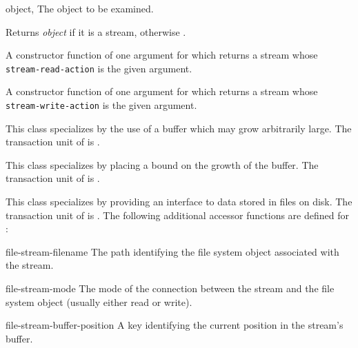 \begin{optDefinition}
\begin{arguments}
  \item[object, \classref{object}] The object to be examined.
\end{arguments}
%
\result%
Returns {\em object\/} if it is a stream, otherwise \nil{}.

A constructor function of one argument for  which
returns a stream whose {\tt stream-read-action} is the given argument.

A constructor function of one argument for  which returns a
stream whose {\tt stream-write-action} is the given argument.

%
This class specializes  by the use of a buffer which may grow
arbitrarily large. The transaction unit of  is
.

%
This class specializes  by placing a bound on the
growth of the buffer. The transaction unit of 
is .

%
This class specializes  by providing an
interface to data stored in files on disk. The transaction unit of
 is . The following additional
accessor functions are defined for :
%
\begin{functions}
    \item[file-stream-filename] The path identifying the file system object
    associated with the stream.
    \item[file-stream-mode] The mode of the connection between the stream and
    the file system object (usually either read or write).
    \item[file-stream-buffer-position] A key identifying the current position in
    the stream's buffer.
\end{functions}


\end{optDefinition}
